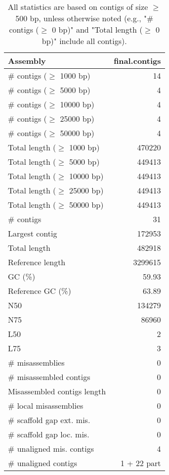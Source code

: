 \documentclass[12pt,a4paper]{article}
\begin{document}
\begin{table}[ht]
\begin{center}
\caption{All statistics are based on contigs of size $\geq$ 500 bp, unless otherwise noted (e.g., "\# contigs ($\geq$ 0 bp)" and "Total length ($\geq$ 0 bp)" include all contigs).}
\begin{tabular}{|l*{1}{|r}|}
\hline
Assembly & final.contigs \\ \hline
\# contigs ($\geq$ 1000 bp) & 14 \\ \hline
\# contigs ($\geq$ 5000 bp) & 4 \\ \hline
\# contigs ($\geq$ 10000 bp) & 4 \\ \hline
\# contigs ($\geq$ 25000 bp) & 4 \\ \hline
\# contigs ($\geq$ 50000 bp) & 4 \\ \hline
Total length ($\geq$ 1000 bp) & 470220 \\ \hline
Total length ($\geq$ 5000 bp) & 449413 \\ \hline
Total length ($\geq$ 10000 bp) & 449413 \\ \hline
Total length ($\geq$ 25000 bp) & 449413 \\ \hline
Total length ($\geq$ 50000 bp) & 449413 \\ \hline
\# contigs & 31 \\ \hline
Largest contig & 172953 \\ \hline
Total length & 482918 \\ \hline
Reference length & 3299615 \\ \hline
GC (\%) & 59.93 \\ \hline
Reference GC (\%) & 63.89 \\ \hline
N50 & 134279 \\ \hline
N75 & 86960 \\ \hline
L50 & 2 \\ \hline
L75 & 3 \\ \hline
\# misassemblies & 0 \\ \hline
\# misassembled contigs & 0 \\ \hline
Misassembled contigs length & 0 \\ \hline
\# local misassemblies & 0 \\ \hline
\# scaffold gap ext. mis. & 0 \\ \hline
\# scaffold gap loc. mis. & 0 \\ \hline
\# unaligned mis. contigs & 4 \\ \hline
\# unaligned contigs & 1 + 22 part \\ \hline

\end{tabular}
\end{center}
\end{table}
\end{document}

